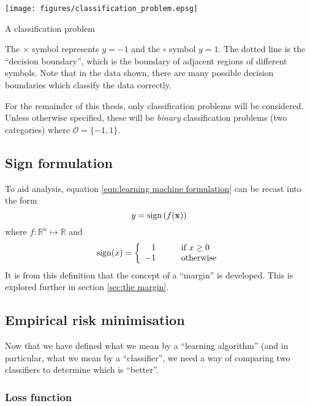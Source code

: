 \begin{linefigure}
\begin{center}
\texttt{[image: figures/classification\_problem.epsg]}
\end{center}
\caption{A classification problem}
\label{fig:classification problem}
The $\times$ symbol represents $y=-1$ and the $\circ$ symbol $y=1$.
The dotted line is the ``decision boundary'', which is the boundary of
adjacent regions of different symbols.  Note that in the data shown,
there are many possible decision boundaries which classify the data
correctly.
\end{linefigure}

For the remainder of this thesis, only classification problems will be
considered.  Unless otherwise specified, these will be \emph{binary}
classification problems (two categories) where $\mathcal{O} = \{-1,
1\}$.

\subsection{Sign formulation}
To aid analysis, equation \ref{eqn:learning machine formulation}
can be recast into the form
%
\begin{equation}
y = \mathrm{sign} \left( f(\mathbf{x}) \right)
\label{eqn:marginal classification formulation}
\end{equation}
%
where $f : \mathbb{R}^n \mapsto \mathbb{R}$ and
%
\begin{equation}
\mathrm{sign} (x) = \left\{ \begin{array}{rl}
1	& \qquad \mbox{if $x \geq 0$} \\
-1	& \qquad \mbox{otherwise}
\end{array} \right.
\end{equation}
%
It is from this definition that the concept of a ``margin'' is
developed.  This is explored further in section \ref{sec:the margin}.


\subsection{Empirical risk minimisation}
\label{sec:erm}

Now that we have defined what we mean by a ``learning algorithm'' (and
in particular, what we mean by a ``classifier'', we need a way of
comparing two classifiers to determine which is ``better''.


\subsubsection{Loss function}

